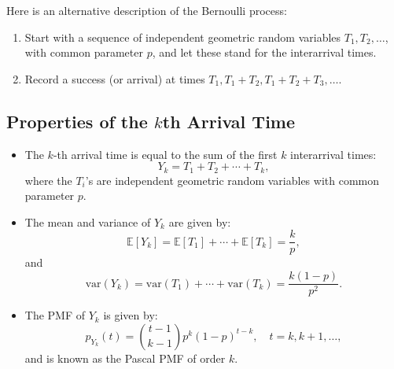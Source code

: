 \documentclass[12pt,a4paper]{article}
\begin{document}
Here is an alternative description of the Bernoulli process:
\begin{enumerate}
	\item Start with a sequence of independent geometric random variables $T_1, T_2, \dots$, with common parameter $p$, and let these stand for the interarrival times.
	\item Record a success (or arrival) at times $T_1, T_1 + T_2, T_1 + T_2 + T_3, \dots$.
\end{enumerate}


\subsection{Properties of the $k$th Arrival Time}
\begin{itemize}
	\item The $k$-th arrival time is equal to the sum of the first $k$ interarrival times:
	\[
	Y_k = T_1 + T_2 + \cdots + T_k,
	\]
	where the $T_i$'s are independent geometric random variables with common parameter $p$.
	
	\item The mean and variance of $Y_k$ are given by:
	\[
	\mathbb{E}[Y_k] = \mathbb{E}[T_1] + \cdots + \mathbb{E}[T_k] = \frac{k}{p},
	\]
	and
	\[
	\text{var}(Y_k) = \text{var}(T_1) + \cdots + \text{var}(T_k) = \frac{k(1 - p)}{p^2}.
	\]
	
	\item The PMF of $Y_k$ is given by:
	\[
	p_{Y_k}(t) = \binom{t-1}{k-1} p^k (1 - p)^{t-k}, \quad t = k, k+1, \dots,
	\]
	and is known as the Pascal PMF of order $k$.
\end{itemize}


\newpage
\end{document}
